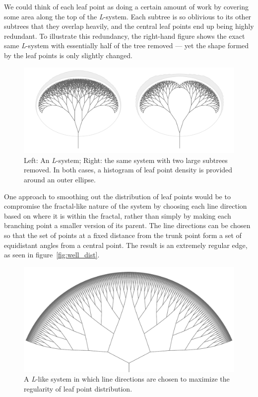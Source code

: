 \documentclass[20pt,]{extarticle}
\begin{document}
We could think of each leaf point as doing a certain amount of work by
covering some area along the top of the \emph{L}-system. Each subtree is
so oblivious to its other subtrees that they overlap heavily, and the
central leaf points end up being highly redundant. To illustrate this
redundancy, the right-hand figure shows the exact same \emph{L}-system
with essentially half of the tree removed --- yet the shape formed by
the leaf points is only slightly changed.

\begin{figure}[htbp]
\centering
\includegraphics{images/pdfs/ellsystem2.pdf}
\caption{\label{fig:ellsystem}Left: An \emph{L}-system; Right: the same
system with two large subtrees removed. In both cases, a histogram of
leaf point density is provided around an outer
ellipse.}\label{fig:ellsystem}
\end{figure}

One approach to smoothing out the distribution of leaf points would be
to compromise the fractal-like nature of the system by choosing each
line direction based on where it is within the fractal, rather than
simply by making each branching point a smaller version of its parent.
The line directions can be chosen so that the set of points at a fixed
distance from the trunk point form a set of equidistant angles from a
central point. The result is an extremely regular edge, as seen in
figure~\ref{fig:well_dist}.

\begin{figure}[htbp]
\centering
\includegraphics{images/pdfs/well_distributed_ell_like_system.pdf}
\caption{\label{fig:well_dist}A \emph{L}-like system in which line
directions are chosen to maximize the regularity of leaf point
distribution.}\label{fig:wellux5fdist}
\end{figure}
\end{document}
